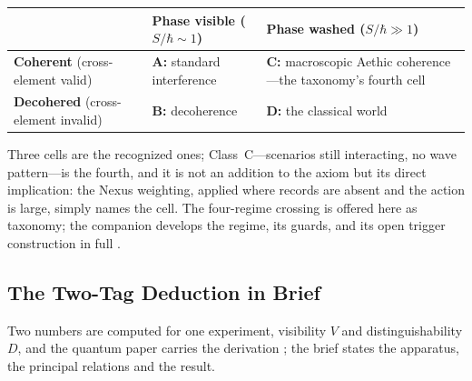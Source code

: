 \documentclass[11pt]{article}
\theoremstyle{definition}
\begin{document}
\renewcommand{\arraystretch}{1.5}
\begin{center}
\small
\setlength{\tabcolsep}{4pt}
\begin{tabular}{|p{}|p{}|p{}|}
\hline
 & \textbf{Phase visible} {\small ($S/\hbar \sim 1$)} & \textbf{Phase washed} {\small ($S/\hbar \gg 1$)} \\
\hline
\textbf{Coherent} {\small (cross-element valid)} & \textbf{A:} standard interference & \textbf{C:} macroscopic Aethic coherence---the taxonomy's fourth cell \\
\hline
\textbf{Decohered} {\small (cross-element invalid)} & \textbf{B:} decoherence & \textbf{D:} the classical world \\
\hline
\end{tabular}
\end{center}

Three cells are the recognized ones; Class~C---scenarios still interacting, no wave pattern---is the fourth, and it is not an addition to the axiom but its direct implication: the Nexus weighting, applied where records are absent and the action is large, simply names the cell. The four-regime crossing is offered here as taxonomy; the companion develops the regime, its guards, and its open trigger construction in full \cite{Aethus}.

\subsection{The Two-Tag Deduction in Brief}\label{sec:two_tag_brief}

Two numbers are computed for one experiment, visibility $V$ and distinguishability $D$, and the quantum paper carries the derivation \cite{AethusQuant}; the brief states the apparatus, the principal relations and the result.
\end{document}
